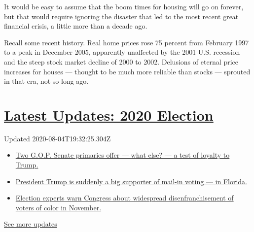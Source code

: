 It would be easy to assume that the boom times for housing will go on
forever, but that would require ignoring the disaster that led to the
most recent great financial crisis, a little more than a decade ago.

Recall some recent history. Real home prices rose 75 percent from
February 1997 to a peak in December 2005, apparently unaffected by the
2001 U.S. recession and the steep stock market decline of 2000 to 2002.
Delusions of eternal price increases for houses --- thought to be much
more reliable than stocks --- sprouted in that era, not so long ago.

\hypertarget{latest-updates-2020-election}{%
\section{\texorpdfstring{\href{https://www.nytimes.com/2020/08/04/us/elections/primary-election-michigan-arizona-kansas.html?action=click\&pgtype=Article\&state=default\&region=MAIN_CONTENT_1\&context=storylines_live_updates}{Latest
Updates: 2020
Election}}{Latest Updates: 2020 Election}}\label{latest-updates-2020-election}}

Updated 2020-08-04T19:32:25.304Z

\begin{itemize}
\tightlist
\item
  \href{https://www.nytimes.com/2020/08/04/us/elections/primary-election-michigan-arizona-kansas.html?action=click\&pgtype=Article\&state=default\&region=MAIN_CONTENT_1\&context=storylines_live_updates\#link-3924dd44}{Two
  G.O.P. Senate primaries offer --- what else? --- a test of loyalty to
  Trump.}
\item
  \href{https://www.nytimes.com/2020/08/04/us/elections/primary-election-michigan-arizona-kansas.html?action=click\&pgtype=Article\&state=default\&region=MAIN_CONTENT_1\&context=storylines_live_updates\#link-32b39e33}{President
  Trump is suddenly a big supporter of mail-in voting --- in Florida.}
\item
  \href{https://www.nytimes.com/2020/08/04/us/elections/primary-election-michigan-arizona-kansas.html?action=click\&pgtype=Article\&state=default\&region=MAIN_CONTENT_1\&context=storylines_live_updates\#link-6d019753}{Election
  experts warn Congress about widespread disenfranchisement of voters of
  color in November.}
\end{itemize}

\href{https://www.nytimes.com/2020/08/04/us/elections/primary-election-michigan-arizona-kansas.html?action=click\&pgtype=Article\&state=default\&region=MAIN_CONTENT_1\&context=storylines_live_updates}{See
more updates}

